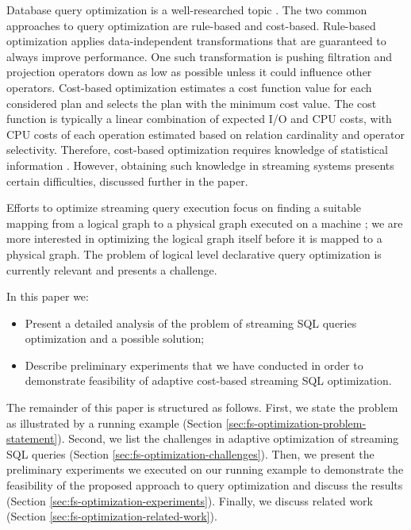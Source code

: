 Database query optimization is a well-researched topic \cite{astrahan1976system, haas1989extensible, graefe1993volcano}. 
The two common approaches to query optimization are rule-based and cost-based. Rule-based optimization applies data-independent transformations that are guaranteed to always improve performance. One such transformation is pushing filtration and projection operators down as low as possible unless it could influence other operators. Cost-based optimization estimates a cost function value for each considered plan and selects the plan with the minimum cost value. The cost function is typically a linear combination of expected I/O and CPU costs, with CPU costs of each operation estimated based on relation cardinality and operator selectivity. Therefore, cost-based optimization requires knowledge of statistical information \cite{Neumann2018optimization}. However, obtaining such knowledge in streaming systems presents certain difficulties, discussed further in the paper.

Efforts to optimize streaming query execution focus on finding a suitable mapping from a logical graph to a physical graph executed on a machine \cite{grulich2020grizzly, gedik2009code}; we are more interested in optimizing the logical graph itself before it is mapped to a physical graph. The problem of logical level declarative query optimization is currently relevant and presents a challenge.

In this paper we:
\begin{itemize}
    \item Present a detailed analysis of the problem of streaming SQL queries optimization and a possible solution;
    \item Describe preliminary experiments that we have conducted in order to demonstrate feasibility of adaptive cost-based streaming SQL optimization.
\end{itemize}

The remainder of this paper is structured as follows. First, we state the problem as illustrated by a running example (Section \ref{sec:fs-optimization-problem-statement}). Second, we list the challenges in adaptive optimization of streaming SQL queries (Section \ref{sec:fs-optimization-challenges}). Then, we present the preliminary experiments we executed on our running example to demonstrate the feasibility of the proposed approach to query optimization and discuss the results (Section \ref{sec:fs-optimization-experiments}). Finally, we discuss related work (Section \ref{sec:fs-optimization-related-work}).     



